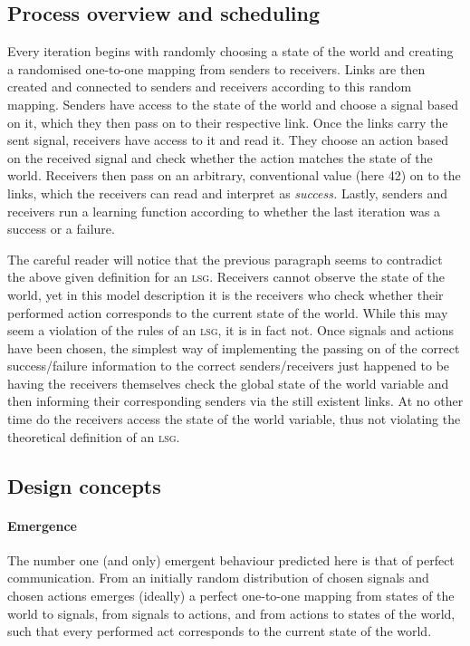 \documentclass[
	DIV=calc,
	BCOR=0mm,
	pagesize,
	titlepage
]{scrartcl}
\newcommand{\lsg}{\textsc{lsg}}
\begin{document}
\subsection{Process overview and scheduling}
\label{ssec:modpro}
Every iteration begins with randomly choosing a state of the world and creating a randomised one-to-one mapping from senders to receivers.
Links are then created and connected to senders and receivers according to this random mapping.
Senders have access to the state of the world and choose a signal based on it, which they then pass on to their respective link.
Once the links carry the sent signal, receivers have access to it and read it.
They choose an action based on the received signal and check whether the action matches the state of the world.
Receivers then pass on an arbitrary, conventional value (here 42) on to the links, which the receivers can read and interpret as \emph{success.}
Lastly, senders and receivers run a learning function according to whether the last iteration was a success or a failure.

The careful reader will notice that the previous paragraph seems to contradict the above given definition for an \lsg.
Receivers cannot observe the state of the world, yet in this model description it is the receivers who check whether their performed action corresponds to the current state of the world.
While this may seem a violation of the rules of an \lsg, it is in fact not.
Once signals and actions have been chosen, the simplest way of implementing the passing on of the correct success/failure information to the correct senders/receivers just happened to be having the receivers themselves check the global state of the world variable and then informing their corresponding senders via the still existent links.
At no other time do the receivers access the state of the world variable, thus not violating the theoretical definition of an \lsg.

\subsection{Design concepts}
\label{ssec:moddes}
\paragraph{Emergence}
The number one (and only) emergent behaviour predicted here is that of perfect communication.
From an initially random distribution of chosen signals and chosen actions emerges (ideally) a perfect one-to-one mapping from states of the world to signals, from signals to actions, and from actions to states of the world, such that every performed act corresponds to the current state of the world.
\end{document}
